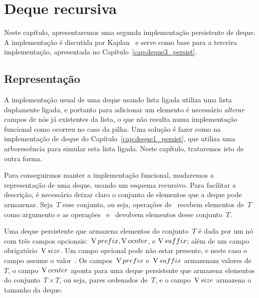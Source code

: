 \documentclass[main.tex]{subfiles}
\begin{document}
\chapter{Deque recursiva} \label{cap:deque2_persist}

Neste capítulo, apresentaremos uma segunda implementação persistente de deque. A implementação é discutida por Kaplan~\cite{Kaplan2001} e serve como base para a terceira implementação, apresentada no Capítulo~\ref{cap:deque3_persist}.


\section{Representação}

A implementação usual de uma deque usando lista ligada utiliza uma lista duplamente ligada, e portanto para adicionar um elemento é necessário \emph{alterar} campos de nós já existentes da lista, o que não resulta numa implementação funcional como ocorreu no caso da pilha. Uma solução é fazer como na implementação de deque do Capítulo~\ref{cap:deque1_persist}, que utiliza uma arborescência para simular esta lista ligada. Neste capítulo, trataremos isto de outra forma.

Para conseguirmos manter a implementação funcional, mudaremos a representação de uma deque, usando um esquema recursivo. Para facilitar a descrição, é necessário deixar claro o conjunto de elementos que a deque pode armazenar. Seja~$T$ esse conjunto, ou seja, operações de~ recebem elementos de~$T$ como argumento e as operações~ e~ devolvem elementos desse conjunto~$T$.

Uma deque persistente que armazena elementos do conjunto~$T$ é dada por um nó com três campos opcionais:~$\operatorname{V}{prefix}, \operatorname{V}{center}$, e $\operatorname{V}{suffix}$; além de um campo obrigatório~$\operatorname{V}{size}$. Um campo opcional pode não estar presente, e neste caso o campo assume o valor~. Os campos~$\operatorname{V}{prefix}$ e~$\operatorname{V}{suffix}$ armazenam valores de~$T$, o campo~$\operatorname{V}{center}$ aponta para uma deque persistente que armazena elementos do conjunto~$T \times T$, ou seja, pares ordenados de~$T$, e o campo~$\operatorname{V}{size}$ armazena o tamanho da deque.
\end{document}

